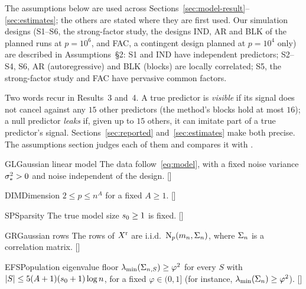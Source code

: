 The assumptions below are used across Sections~\ref{sec:model-result}--\ref{sec:estimates}; the others are stated
where they are first used. Our simulation designs (S1--S6, the strong-factor study, the designs IND, AR and BLK of the
planned runs at $p=10^6$, and FAC, a contingent design planned at $p=10^4$ only) are described in Assumptions~\S2: S1 and IND have independent predictors; S2--S4,
S6, AR (autoregressive) and BLK (blocks) are locally correlated; S5, the strong-factor study and FAC have pervasive common
factors.

Two words recur in Results~3 and~4. A true predictor is \emph{visible} if its signal does not cancel against any $15$ other
predictors (the method's blocks hold at most $16$); a null predictor \emph{leaks} if, given up to $15$ others, it can imitate
part of a true predictor's signal. Sections~\ref{sec:reported} and~\ref{sec:estimates} make both precise.
The assumptions section judges each of them and compares it with \citet{SongLiang2015}.

\begin{assumption}{GL}{Gaussian linear model}
The data follow~\eqref{eq:model}, with a fixed noise variance $\sigma_*^2>0$ and noise independent of the design. \hfill []
\end{assumption}

\begin{assumption}{DIM}{Dimension}
$2\le p\le n^A$ for a fixed $A\ge1$. \hfill []
\end{assumption}

\begin{assumption}{SP}{Sparsity}
The true model size $s_0\ge1$ is fixed. \hfill []
\end{assumption}

\begin{assumption}{GR}{Gaussian rows}
The rows of $X^{\mathrm r}$ are i.i.d.\ $\mathrm{N}_p(m_n,\Sigma_n)$, where $\Sigma_n$ is a correlation matrix. \hfill []
\end{assumption}

\begin{assumption}{EFS}{Population eigenvalue floor}
$\lambda_{\min}(\Sigma_{n,S})\ge\varphi^2$ for every $S$ with $\lvert S\rvert\le5(A+1)(s_0+1)\log n$, for a fixed $\varphi\in(0,1]$ (for
instance, $\lambda_{\min}(\Sigma_n)\ge\varphi^2$). \hfill []
\end{assumption}

